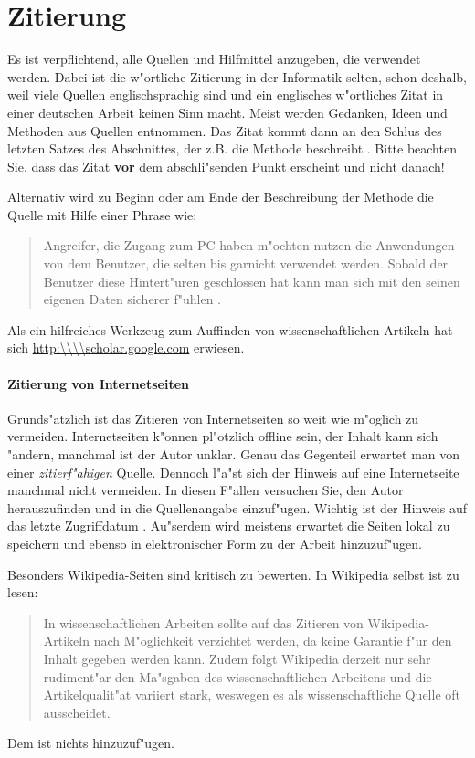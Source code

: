 \section{Zitierung}\label{zitierung}

Es ist verpflichtend, alle Quellen und Hilfmittel anzugeben, die verwendet werden.
Dabei ist die w"ortliche Zitierung in der Informatik selten, schon deshalb, weil viele Quellen englischsprachig sind und ein englisches w"ortliches Zitat in einer deutschen Arbeit keinen Sinn macht.
Meist werden Gedanken, Ideen und Methoden aus Quellen entnommen.
Das Zitat kommt dann an den Schlus des letzten Satzes des Abschnittes, der z.B. die Methode beschreibt \cite{wissentschaftlichesArbeitMitLatex}.
Bitte beachten Sie, dass das Zitat \textbf{vor} dem abschli"senden Punkt erscheint und nicht danach!

Alternativ wird zu Beginn oder am Ende der Beschreibung der Methode die Quelle mit Hilfe einer Phrase wie:
\begin{quote}
Angreifer, die Zugang zum PC haben m"ochten nutzen die Anwendungen von dem Benutzer, die selten bis garnicht verwendet werden. Sobald der Benutzer diese Hintert"uren geschlossen hat kann man sich mit den seinen eigenen Daten sicherer f"uhlen \cite{ctWindowsEinfachAbsichern}.
\end{quote}


Als ein hilfreiches Werkzeug zum Auffinden von wissenschaftlichen Artikeln hat sich \url{http:\\\\scholar.google.com} erwiesen.

\paragraph{Zitierung von Internetseiten}
Grunds"atzlich ist das Zitieren von Internetseiten so weit wie m"oglich zu vermeiden.
Internetseiten k"onnen pl"otzlich offline sein, der Inhalt kann sich "andern, manchmal ist der Autor unklar.
Genau das Gegenteil erwartet man von einer \emph{zitierf"ahigen} Quelle.
Dennoch l"a"st sich der Hinweis auf eine Internetseite manchmal nicht vermeiden.
In diesen F"allen versuchen Sie, den Autor herauszufinden und in die Quellenangabe einzuf"ugen.
Wichtig ist der Hinweis auf das letzte Zugriffdatum \cite{zitieren13}.
Au"serdem wird meistens erwartet die Seiten lokal zu speichern und ebenso in elektronischer Form zu der Arbeit hinzuzuf"ugen.

Besonders Wikipedia-Seiten sind kritisch zu bewerten. In Wikipedia selbst ist zu lesen:
\begin{quote}
\glqq In wissenschaftlichen Arbeiten sollte auf das Zitieren von Wikipedia-Artikeln nach M"oglichkeit verzichtet werden, da keine Garantie f"ur den Inhalt gegeben werden kann.
Zudem folgt Wikipedia derzeit nur sehr rudiment"ar den Ma"sgaben des wissenschaftlichen Arbeitens und die Artikelqualit"at variiert stark, weswegen es als wissenschaftliche Quelle oft ausscheidet.\grqq \cite{zitieren13a}
\end{quote}
Dem ist nichts hinzuzuf"ugen.

